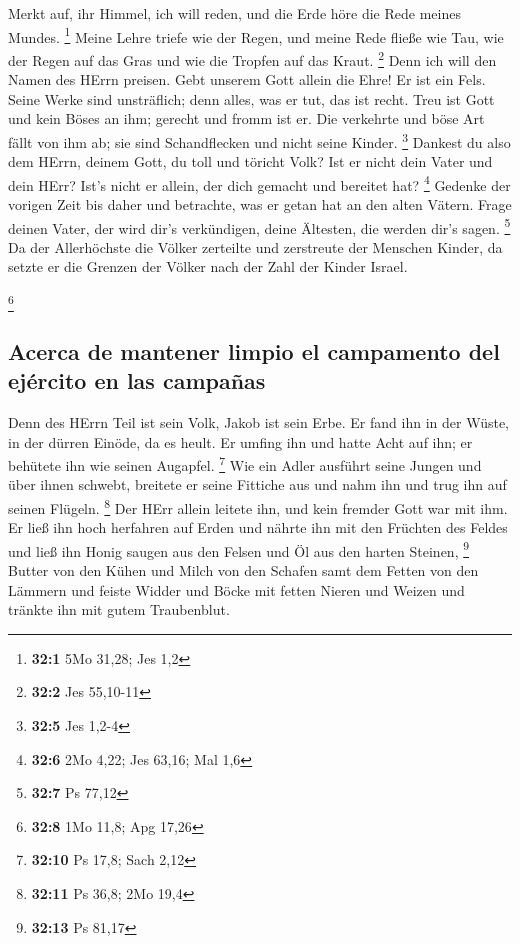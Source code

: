  Merkt auf, ihr Himmel, ich will reden, und die Erde höre
die Rede meines Mundes. \footnote{\textbf{32:1} 5Mo 31,28; Jes 1,2}
 Meine Lehre triefe wie der Regen, und meine Rede fließe
wie Tau, wie der Regen auf das Gras und wie die Tropfen auf das Kraut.
\footnote{\textbf{32:2} Jes 55,10-11}  Denn ich will den
Namen des HErrn preisen. Gebt unserem Gott allein die Ehre!
 Er ist ein Fels. Seine Werke sind unsträflich; denn
alles, was er tut, das ist recht. Treu ist Gott und kein Böses an ihm;
gerecht und fromm ist er.  Die verkehrte und böse Art
fällt von ihm ab; sie sind Schandflecken und nicht seine Kinder.
\footnote{\textbf{32:5} Jes 1,2-4}  Dankest du also dem
HErrn, deinem Gott, du toll und töricht Volk? Ist er nicht dein Vater
und dein HErr? Ist's nicht er allein, der dich gemacht und bereitet hat?
\footnote{\textbf{32:6} 2Mo 4,22; Jes 63,16; Mal 1,6} 
Gedenke der vorigen Zeit bis daher und betrachte, was er getan hat an
den alten Vätern. Frage deinen Vater, der wird dir's verkündigen, deine
Ältesten, die werden dir's sagen. \footnote{\textbf{32:7} Ps 77,12}
 Da der Allerhöchste die Völker zerteilte und zerstreute
der Menschen Kinder, da setzte er die Grenzen der Völker nach der Zahl
der Kinder Israel.

\footnote{\textbf{32:8} 1Mo 11,8; Apg 17,26}

\hypertarget{acerca-de-mantener-limpio-el-campamento-del-ejuxe9rcito-en-las-campauxf1as}{%
\subsection{Acerca de mantener limpio el campamento del ejército en las
campañas}\label{acerca-de-mantener-limpio-el-campamento-del-ejuxe9rcito-en-las-campauxf1as}}

 Denn des HErrn Teil ist sein Volk, Jakob ist sein Erbe.
 Er fand ihn in der Wüste, in der dürren Einöde, da es
heult. Er umfing ihn und hatte Acht auf ihn; er behütete ihn wie seinen
Augapfel. \footnote{\textbf{32:10} Ps 17,8; Sach 2,12} 
Wie ein Adler ausführt seine Jungen und über ihnen schwebt, breitete er
seine Fittiche aus und nahm ihn und trug ihn auf seinen Flügeln.
\footnote{\textbf{32:11} Ps 36,8; 2Mo 19,4}  Der HErr
allein leitete ihn, und kein fremder Gott war mit ihm. 
Er ließ ihn hoch herfahren auf Erden und nährte ihn mit den Früchten des
Feldes und ließ ihn Honig saugen aus den Felsen und Öl aus den harten
Steinen, \footnote{\textbf{32:13} Ps 81,17}  Butter von
den Kühen und Milch von den Schafen samt dem Fetten von den Lämmern und
feiste Widder und Böcke mit fetten Nieren und Weizen und tränkte ihn mit
gutem Traubenblut.

